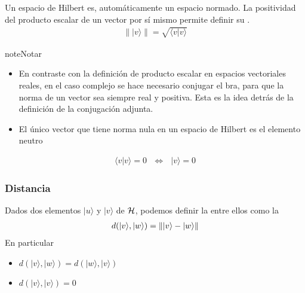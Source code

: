 \documentclass[letterpaper,10pt,english]{jupyterBook}
\newcommand{\ket}[1]{|#1\rangle}
\newcommand{\braket}[2]{\langle #1|#2\rangle}
\newcommand{\Hil}{{\cal H}}
\begin{document}
\sphinxAtStartPar
Un espacio de Hilbert es, automáticamente un espacio normado.
La positividad  del producto escalar de un vector por sí mismo  permite definir su .
\begin{equation*}
\begin{split}
\|\ket{v}\| = \sqrt{\braket{v}{v}} 
\end{split}
\end{equation*}
\begin{sphinxadmonition}{note}{Notar}
\begin{itemize}
\item {} 
\sphinxAtStartPar
En contraste con la definición de producto escalar en espacios vectoriales reales, en el caso complejo se hace necesario conjugar el bra, para  que la norma de un vector sea siempre real y positiva. Esta es la idea detrás de la definición de la conjugación adjunta.

\item {} 
\sphinxAtStartPar
El único vector que tiene norma nula en un espacio de Hilbert es el elemento neutro

\end{itemize}
\begin{equation*}
\begin{split}
\braket{v}{v} = 0 ~~~ \Leftrightarrow ~~~\ket{v} = 0
\end{split}
\end{equation*}\end{sphinxadmonition}


\subsubsection{Distancia}
\label{\detokenize{docs/Part_01_Formalismo/Chapter_01_02_Formalismo_matem_xe1tico/01_02_Vectores_myst:distancia}}
\sphinxAtStartPar
Dados dos elementos \(\ket{u}\) y \(\ket{v}\) de \(\Hil\), podemos definir la  entre ellos como la 
\begin{equation*}
\begin{split}
d(\rule{0mm}{5mm}\ket{v},\ket{w}) = \| \ket{v}-\ket{w}\|
\end{split}
\end{equation*}
\sphinxAtStartPar
En particular
\begin{itemize}
\item {} 
\sphinxAtStartPar
\(d(\ket{v}, \ket{w}) = d(\ket{w}, \ket{v})\)

\item {} 
\sphinxAtStartPar
\(d(\ket{v}, \ket{v}) = 0\)

\end{itemize}
\end{document}

